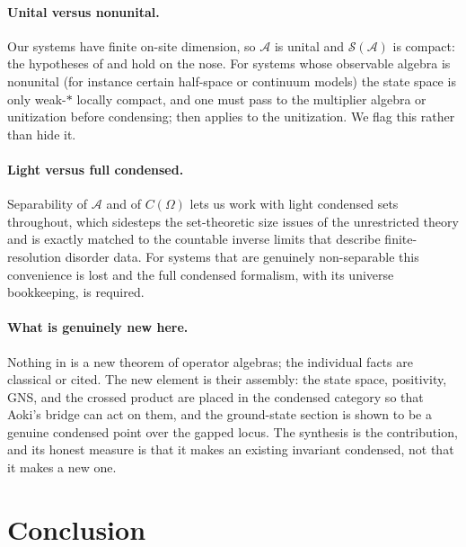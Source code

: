 \documentclass[12pt]{article}
\newcommand{\dis}{\Omega}                       %
\newcommand{\qla}{\mathcal{A}}                  %
\newcommand{\St}{\mathcal{S}}                   %
\theoremstyle{plain}
\begin{document}
\paragraph{Unital versus nonunital.}
Our systems have finite on-site dimension, so $\qla$ is unital and $\St(\qla)$ is
compact: the hypotheses of  and  hold on
the nose. For systems whose observable algebra is nonunital (for instance certain
half-space or continuum models) the state space is only weak-$\ast$ locally compact,
and one must pass to the multiplier algebra or unitization before condensing;
 then applies to the unitization. We flag this rather than hide
it.

\paragraph{Light versus full condensed.}
Separability of $\qla$ and of $C(\dis)$ lets us work with light condensed sets
throughout, which sidesteps the set-theoretic size issues of the unrestricted theory
and is exactly matched to the countable inverse limits that describe finite-resolution
disorder data. For systems that are genuinely non-separable this convenience is lost
and the full condensed formalism, with its universe bookkeeping, is required.

\paragraph{What is genuinely new here.}
Nothing in  is a new theorem of
operator algebras; the individual facts are classical or cited. The new element is
their assembly: the state space, positivity, GNS, and the crossed product are placed
in the condensed category so that Aoki's bridge can act on them, and the ground-state
section is shown to be a genuine condensed point over the gapped locus. The synthesis
is the contribution, and its honest measure is that it makes an existing invariant
condensed, not that it makes a new one.

\section{Conclusion}
\label{sec:conclusion}
\end{document}
